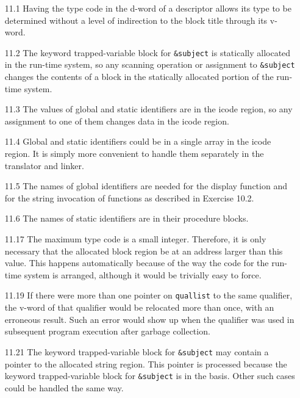 \begin{itemize}
\goodbreak\item[11.1]
Having the type code in the d-word of a descriptor allows its type to be
determined without a level of indirection to the block title through its v-word.

\goodbreak\item[11.2]
The keyword trapped-variable block for \texttt{\&subject} is statically allocated in
the run-time system, so any scanning operation or assignment to \texttt{\&subject}
changes the contents of a block in the statically allocated portion of the
run-time system.

\goodbreak\item[11.3]
The values of global and static identifiers are in the icode region, so any
assignment to one of them changes data in the icode region.

\goodbreak\item[11.4]
Global and static identifiers could be in a single array in the icode region.
It is simply more convenient to handle them separately in the translator
and linker.

\goodbreak\item[11.5]
The names of global identifiers are needed for the display function and for
the string invocation of functions as described in Exercise 10.2.

\goodbreak\item[11.6]
The names of static identifiers are in their procedure blocks.

\goodbreak\item[11.17]
The maximum type code is a small integer. Therefore, it is only necessary
that the allocated block region be at an address larger than this value. This
happens automatically because of the way the code for the run-time system
is arranged, although it would be trivially easy to force.

\goodbreak\item[11.19]
If there were more than one pointer on \texttt{quallist} to the same qualifier, the
v-word of that qualifier would be relocated more than once, with an
erroneous result. Such an error would show up when the qualifier was
used in subsequent program execution after garbage collection.

\goodbreak\item[11.21]
The keyword trapped-variable block for \texttt{\&subject} may contain a pointer to
the allocated string region. This pointer is processed because the keyword
trapped-variable block for \texttt{\&subject} is in the basis. Other such cases
could be handled the same way.


\end{itemize}
